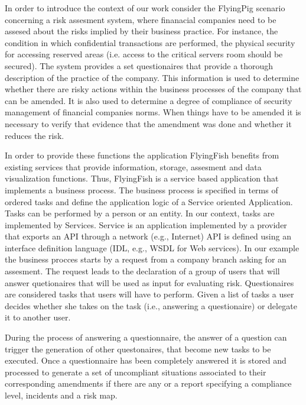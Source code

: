 


In order to introduce the context of our work consider the FlyingPig scenario concerning a risk assesment system, where finanacial companies need to be assesed about the risks implied by their business practice. For instance, the condition in which confidential transactions are performed, the physical security for accessing reserved areas (i.e. access to the critical servers room should be secured). The system provides a set questionaires that provide a thorough description of the practice of the company. This information is used to determine whether there are risky actions within the business processes of the company that can be amended. It is also used to determine a degree of compliance of security management of financial companies norms. When things have to be amended it is necessary to verify that evidence that the amendment was done and whether it  reduces the risk. 



 In order to provide these functions the application FlyingFish benefits from existing services that provide information,  storage, assesment and data visualization functions. Thus, FlyingFish is a service based application that implements a business process.
 The business process is specified in terms of ordered tasks and define the application logic of a Service oriented Application. Tasks can be performed by a person or an entity. In our context, tasks are implemented by Services. 
Service is an application implemented by a provider that exports an API through a network (e.g., Internet)
API is defined using an interface definition language (IDL, e.g., WSDL for Web services).
 In our example the business procces  starts by a request from a company branch asking for an assesment. The request leads to the declaration of a group of users that will answer quetionaires that will be used as input for evaluating risk. Questionaires are considered tasks that users will have to perform. Given a list of tasks a user decides whether she takes on the task (i.e., answering a questionaire) or delegate it to another user. 
 
During the process of answering a questionnaire, the answer of a question can trigger the generation of other questonaires, that become new tasks to be executed. Once a questionnaire has been completely answered it is stored and processed to generate a set of uncompliant situations associated to their corresponding amendments if there are any or a report specifying a compliance level, incidents and a risk map. 
 
